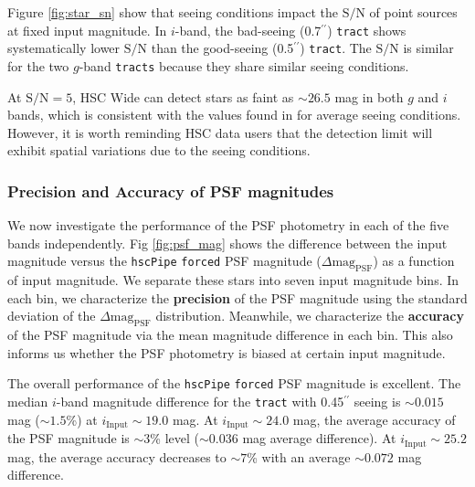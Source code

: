 \documentclass[useamsfonts]{pasj01}
\def\asec{$^{\prime\prime}$}
\def\hscpipe{\texttt{hscPipe}}
\def\forced{\texttt{forced}}
\def\tract{\texttt{tract}}
\def\tracts{\texttt{tracts}}
\def\s2n{{$\mathrm{S}/\mathrm{N}$}}
\begin{document}
    Figure \ref{fig:star_sn} show that seeing conditions impact the \s2n{} of point
    sources at fixed input magnitude.
    In $i$-band, the bad-seeing (0.7\asec{}) \tract{} shows systematically
    lower \s2n{} than the good-seeing (0.5\asec{}) \tract{}.
    The \s2n{} is similar for the two $g$-band \tracts{} because they share similar 
    seeing conditions. 

    At \s2n{}$=5$, HSC Wide can detect stars as faint as ${\sim}26.5$ mag in both $g$ 
    and $i$ bands, which is consistent with the values found in \citet{HSCDR1} for 
    average seeing conditions.
    However, it is worth reminding HSC data users that the detection
    limit will exhibit spatial variations due to the seeing conditions.

\subsubsection{Precision and Accuracy of PSF magnitudes}

    We now investigate the performance of the PSF photometry in each of the five bands
    independently. 
    Fig \ref{fig:psf_mag} shows the difference between the input magnitude versus the
    \hscpipe{} \forced{} PSF magnitude ($\Delta \mathrm{mag}_{\mathrm{PSF}}$) as a 
    function of input magnitude. 
    We separate these stars into seven input magnitude bins.  
    In each bin, we characterize the \textbf{precision} of the PSF magnitude using 
    the standard deviation of the $\Delta \mathrm{mag}_{\mathrm{PSF}}$ distribution.
    Meanwhile, we characterize the \textbf{accuracy} of the PSF magnitude via the 
    mean magnitude difference in each bin. 
    This also informs us whether the PSF photometry is biased at certain input 
    magnitude.
    
    The overall performance of the \hscpipe{} \forced{} PSF magnitude is excellent. 
    The median $i$-band magnitude difference for the \tract{} with 0.45\asec{} seeing 
    is ${\sim}0.015$ mag (${\sim}1.5$\%) at $i_{\mathrm{Input}}{\sim}19.0$ mag. 
    At $i_{\mathrm{Input}}{\sim}24.0$ mag, the average accuracy of the PSF magnitude is 
    ${\sim}3$\% level (${\sim}0.036$ mag average difference).
    At $i_{\mathrm{Input}}{\sim}25.2$ mag, the average accuracy decreases to
    ${\sim}7$\% with an average ${\sim}0.072$ mag difference.
    
\end{document}
